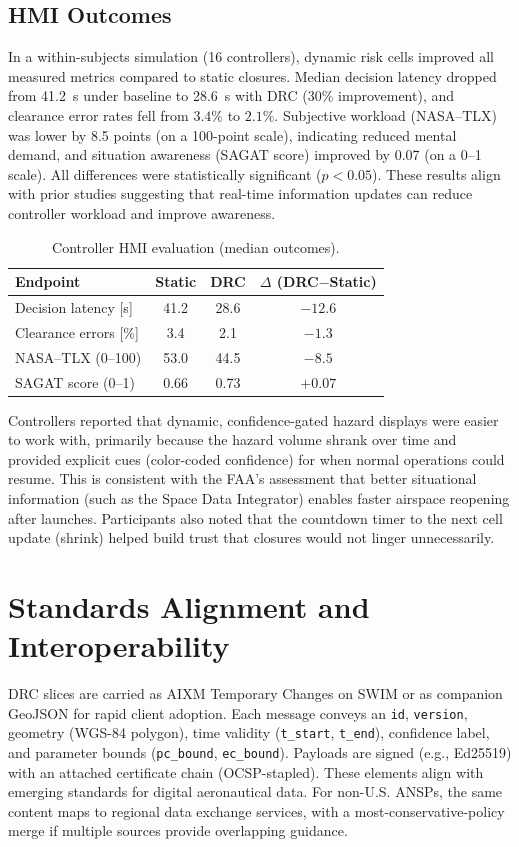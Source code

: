 \documentclass[journal]{new-aiaa}
\newcommand{\DRC}{\textsc{DRC}}
\newcommand{\AIXM}{\textsc{AIXM}}
\newcommand{\SWIM}{\textsc{SWIM}}
\begin{document}
\subsection{HMI Outcomes}
In a within-subjects simulation (16 controllers), dynamic risk cells improved all measured metrics compared to static closures. Median decision latency dropped from 41.2~s under baseline to 28.6~s with \DRC{} (30\% improvement), and clearance error rates fell from $3.4\%$ to $2.1\%$. Subjective workload (NASA--TLX) was lower by 8.5 points (on a 100-point scale), indicating reduced mental demand, and situation awareness (SAGAT score) improved by 0.07 (on a 0--1 scale). All differences were statistically significant ($p<0.05$). These results align with prior studies suggesting that real-time information updates can reduce controller workload and improve awareness.

\begin{table}[h!]
\centering
\caption{Controller HMI evaluation (median outcomes).}
\label{tab:hmi}
\begin{tabular}{@{}lccc@{}}
\toprule
Endpoint & Static & \DRC{} & $\Delta$ (\DRC{}$-$Static) \\
\midrule
Decision latency [s] & 41.2 & 28.6 & $-12.6$ \\
Clearance errors [\%] & 3.4 & 2.1 & $-1.3$ \\
NASA--TLX (0--100) & 53.0 & 44.5 & $-8.5$ \\
SAGAT score (0--1) & 0.66 & 0.73 & $+0.07$ \\
\bottomrule
\end{tabular}
\end{table}

Controllers reported that dynamic, confidence-gated hazard displays were easier to work with, primarily because the hazard volume shrank over time and provided explicit cues (color-coded confidence) for when normal operations could resume. This is consistent with the FAA’s assessment that better situational information (such as the Space Data Integrator) enables faster airspace reopening after launches.\cite{FAA2023} Participants also noted that the countdown timer to the next cell update (shrink) helped build trust that closures would not linger unnecessarily.

\section{Standards Alignment and Interoperability}
\DRC{} slices are carried as \AIXM{} Temporary Changes on \SWIM{} or as companion GeoJSON for rapid client adoption. Each message conveys an \texttt{id}, \texttt{version}, geometry (WGS-84 polygon), time validity (\texttt{t\_start}, \texttt{t\_end}), confidence label, and parameter bounds (\texttt{pc\_bound}, \texttt{ec\_bound}). Payloads are signed (e.g., Ed25519) with an attached certificate chain (OCSP-stapled). These elements align with emerging standards for digital aeronautical data. For non-U.S. ANSPs, the same content maps to regional data exchange services, with a most-conservative-policy merge if multiple sources provide overlapping guidance.
\end{document}
